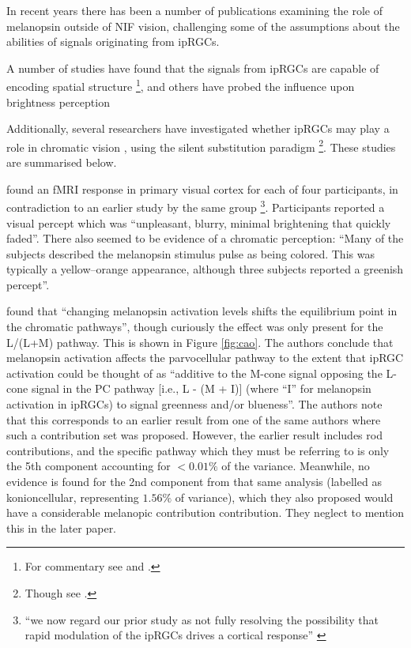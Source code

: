 In recent years there has been a number of publications examining the role of melanopsin outside of \gls{NIF} vision, challenging some of the assumptions about the abilities of signals originating from \glspl{ipRGC}.

A number of studies have found that the signals from ipRGCs are capable of encoding spatial structure \citep{ecker_melanopsin-expressing_2010, mouland_responses_2017, allen_melanopsin_2017, allen_form_2019, zhao_photoresponse_2014}\footnote{For commentary see \citet{spitschan_vision_2017} and \citet{sonoda_re-evaluating_2016}.}, and others have probed the influence upon brightness perception \citep{zele_cone_2018,brown_melanopsin-based_2012}

Additionally, several researchers have investigated whether \glspl{ipRGC} may play a role in chromatic vision \citep{cao_evidence_2018, spitschan_human_2017-1,zele_melanopsin_2018,horiguchi_human_2013,vincent_adaptation_2019,vincent_adaptation_2019-1}, using the silent substitution paradigm \citep{estevez_silent_1982,spitschan_method_2018}\footnote{Though see \citet{kamar_silent-substitution_2019}.}. These studies are summarised below.

\citet{spitschan_human_2017-1} found an fMRI response in primary visual cortex for each of four participants, in contradiction to an earlier study by the same group \citep{spitschan_human_2016}\footnote{``we now regard our prior study as not fully resolving the possibility that rapid modulation of the ipRGCs drives a cortical response'' \citep{spitschan_human_2017-1}}. Participants reported a visual percept which was ``unpleasant, blurry, minimal brightening that quickly faded''. There also seemed to be evidence of a chromatic perception: ``Many of the subjects described the melanopsin stimulus pulse as being colored. This was typically a yellow–orange appearance, although three subjects reported a greenish percept''.


\citet{cao_evidence_2018} found that ``changing melanopsin activation levels shifts the equilibrium point in the chromatic pathways'', though curiously the effect was only present for the L/(L+M) pathway. This is shown in Figure \ref{fig:cao}. The authors conclude that melanopsin activation affects the parvocellular pathway to the extent that \gls{ipRGC} activation could be thought of as ``additive to the M-cone signal opposing the L-cone signal in the PC pathway [i.e., L - (M + I)] (where ``I'' for melanopsin activation in ipRGCs) to signal greenness and/or blueness''. The authors note that this corresponds to an earlier result from one of the same authors \citep{barrionuevo_contributions_2014} where such a contribution set was proposed. However, the earlier result includes rod contributions, and the specific pathway which they must be referring to is only the 5th component accounting for $<0.01\%$ of the variance. Meanwhile, no evidence is found for the 2nd component from that same analysis (labelled as konioncellular, representing $1.56\%$ of variance), which they also proposed would have a considerable melanopic contribution contribution. They neglect to mention this in the later paper.

